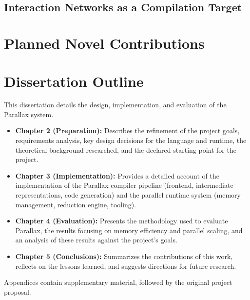 \subsection{Interaction Networks as a Compilation Target}


\section{Planned Novel Contributions}


\section{Dissertation Outline}
This dissertation details the design, implementation, and evaluation of the Parallax system. 
\begin{itemize}
    \item \textbf{Chapter 2 (Preparation):} Describes the refinement of the project goals, requirements analysis, key design decisions for the language and runtime, the theoretical background researched, and the declared starting point for the project.
    \item \textbf{Chapter 3 (Implementation):} Provides a detailed account of the implementation of the Parallax compiler pipeline (frontend, intermediate representations, code generation) and the parallel runtime system (memory management, reduction engine, tooling).
    \item \textbf{Chapter 4 (Evaluation):} Presents the methodology used to evaluate Parallax, the results focusing on memory efficiency and parallel scaling, and an analysis of these results against the project's goals.
    \item \textbf{Chapter 5 (Conclusions):} Summarizes the contributions of this work, reflects on the lessons learned, and suggests directions for future research.
\end{itemize}
Appendices contain supplementary material, followed by the original project proposal. 